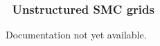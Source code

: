 \vssub
\subsubsection{~Unstructured SMC grids} \label{sub:num_space_SMC}

\noindent
Documentation not yet available.
